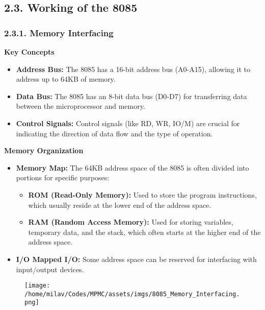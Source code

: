\documentclass[
]{article}
\begin{document}
\hypertarget{23-working-of-the-8085}{%
\subsection{2.3. Working of the 8085}\label{23-working-of-the-8085}}

\hypertarget{231-memory-interfacing}{%
\subsubsection{2.3.1. Memory Interfacing}\label{231-memory-interfacing}}

\textbf{Key Concepts}

\begin{itemize}
\item
  \textbf{Address Bus:} The 8085 has a 16-bit address bus (A0-A15),
  allowing it to address up to 64KB of memory.
\item
  \textbf{Data Bus:} The 8085 has an 8-bit data bus (D0-D7) for
  transferring data between the microprocessor and memory.
\item
  \textbf{Control Signals:} Control signals (like RD, WR, IO/M) are
  crucial for indicating the direction of data flow and the type of
  operation.
\end{itemize}

\textbf{Memory Organization}

\begin{itemize}
\item
  \textbf{Memory Map:} The 64KB address space of the 8085 is often
  divided into portions for specific purposes:

  \begin{itemize}
  \item
    \textbf{ROM (Read-Only Memory):} Used to store the program
    instructions, which usually reside at the lower end of the address
    space.
  \item
    \textbf{RAM (Random Access Memory):} Used for storing variables,
    temporary data, and the stack, which often starts at the higher end
    of the address space.
  \end{itemize}
\item
  \textbf{I/O Mapped I/O:} Some address space can be reserved for
  interfacing with input/output devices.
\end{itemize}

\begin{figure}
\centering
\texttt{[image: /home/milav/Codes/MPMC/assets/imgs/8085\_Memory\_Interfacing.png]}
\caption{}
\end{figure}
\end{document}
